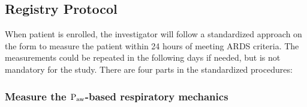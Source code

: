 \documentclass[11pt]{article} %
\def\Vt{$\rm{V_T}$}
\def\VE{$\rm{\dot{V}_E}$}
\def\Paw{$\rm{P_{aw}}$}
\def\Pplat{$\rm{P_{plat}}$}
\def\Ppeak{$\rm{P_{peak}}$}
\def\PEEPtot{$\rm{PEEP_{tot}}$}
\begin{document}
\subsection{Registry Protocol}
When patient is enrolled, the investigator will follow a standardized approach on the form to measure the patient within 24 hours of meeting ARDS criteria. The measurements could be repeated in the following days if needed, but is not mandatory for the study. There are four parts in the standardized procedures:

\subsubsection{Measure the \Paw-based respiratory mechanics}
%
\end{document}
